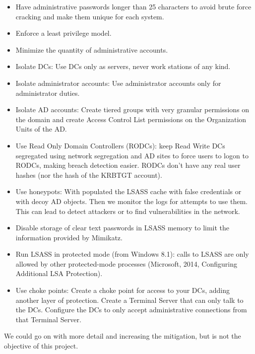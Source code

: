 \begin{itemize}
	\item Have administrative passwords longer than 25 characters to avoid brute force cracking and make them unique for each system.
	\item Enforce a least privilege model.
	\item Minimize the quantity of administrative accounts.
	\item Isolate DCs: Use DCs only as servers, never work stations of any kind.
	\item Isolate administrator accounts: Use administrator accounts only for administrator duties.
	\item Isolate AD accounts: Create tiered groups with very granular permissions on the domain and create Access Control List permissions on the Organization Units of the AD\cite{AD_tier}.
	\item Use Read Only Domain Controllers (RODCs): keep Read Write DCs segregated using network segregation and AD sites to force users to logon to RODCs, making breach detection easier. RODCs don't have any real user hashes (nor the hash of the KRBTGT account)\cite{reset_RODC}\cite{hood}.
	\item Use honeypots: With populated the LSASS cache with false credentials\cite{SANS_mimikatz}\cite{honeyhashes} or with decoy AD objects\cite{decoy_AD}. Then we monitor the logs for attempts to use them. This can lead to detect attackers or to find vulnerabilities in the network.
	\item Disable storage of clear text passwords in LSASS memory to limit the information provided by Mimikatz\cite{SANS_mimikatz}.
	\item Run LSASS in protected mode (from Windows 8.1): calls to LSASS are only allowed by other protected-mode processes (Microsoft, 2014, Configuring Additional LSA Protection)\cite{SANS_mimikatz}\cite{understanding_powersploit_mimikatz}.
	\item Use choke points: Create a choke point for access to your DCs, adding another layer of protection. Create a Terminal Server that can only talk to the DCs. Configure the DCs to only accept administrative connections from that Terminal Server\cite{choke}.
\end{itemize}
\linej
We could go on with more detail and increasing the mitigation\cite{AD_defense}, but is not the objective of this project.

